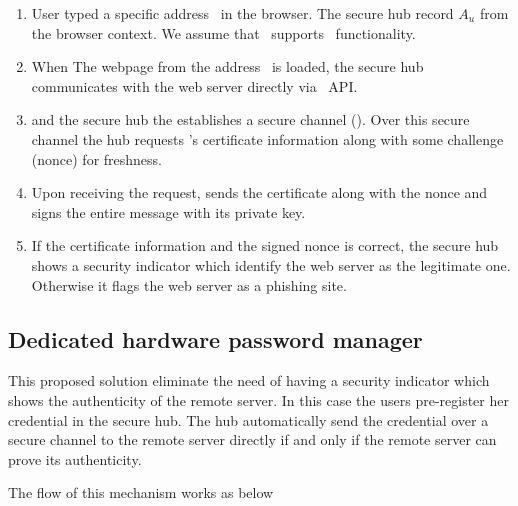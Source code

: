 \begin{enumerate}
  \item User typed a specific address \server\ in the browser. The secure hub record $A_u$ from the browser context. We assume that \server\ supports \webusb\ functionality.
  
  \item When The webpage from the address \server\ is loaded, the secure hub communicates with the web server directly via \webusb\ API.
  
  \item \server and the secure hub the establishes a secure channel (\tls). Over this secure channel the hub requests \server's certificate information along with some challenge (nonce) for freshness.
  
  \item Upon receiving the request, \server sends the certificate along with the nonce and signs the entire message with its private key.
  
  \item If the certificate information and the signed nonce is correct, the secure hub shows a security indicator which identify the web server as the legitimate one. Otherwise it flags the web server as a phishing site.

\end{enumerate}  


\subsection{Dedicated hardware password manager}

This proposed solution eliminate the need of having a security indicator which shows the authenticity of the remote server. In this case the users pre-register her credential in the secure hub. The hub automatically send the credential over a secure channel to the remote server directly if and only if the remote server can prove its authenticity.

 The flow of this mechanism works as below

